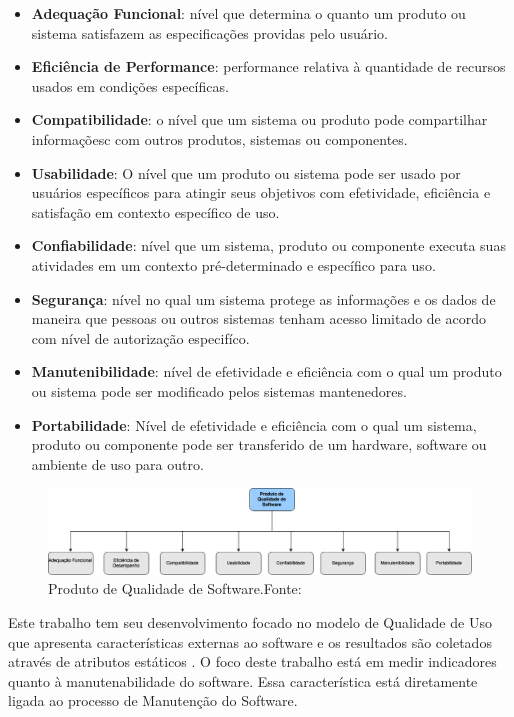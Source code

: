 \begin{itemize}
\item \textbf{Adequação Funcional}: nível que determina o quanto um produto ou sistema satisfazem as especificações providas pelo usuário.
\item \textbf{Eficiência de Performance}: performance relativa à quantidade de recursos usados em condições específicas.
\item \textbf{Compatibilidade}: o nível que um sistema ou produto pode compartilhar informaçõesc com outros produtos, sistemas ou componentes.
\item \textbf{Usabilidade}: O nível que um produto ou sistema pode ser usado por usuários específicos para atingir seus objetivos com efetividade, eficiência e satisfação em contexto específico de uso.
\item \textbf{Confiabilidade}: nível que um sistema, produto ou componente executa suas atividades em um contexto pré-determinado e específico para uso.
\item \textbf{Segurança}: nível no qual um sistema protege as informações e os dados de maneira que pessoas ou outros sistemas tenham acesso limitado de acordo com nível de autorização especifíco.
\item \textbf{Manutenibilidade}: nível de efetividade e eficiência com o qual um produto ou sistema pode ser modificado pelos sistemas mantenedores.
\item \textbf{Portabilidade}: Nível de efetividade e eficiência com o qual um sistema, produto ou componente pode ser transferido de um hardware, software ou ambiente de uso para outro.
\end{itemize}
\graphicspath{{figuras/}}
\begin{figure}[h]
\centering
\includegraphics[scale=0.40]{SQuaRE}
\caption{Produto de Qualidade de Software.Fonte:\cite{Square}}
\label{img:modelo_square}
\end{figure}

Este trabalho tem seu desenvolvimento focado no modelo de Qualidade de Uso que apresenta características externas ao software e os resultados são coletados através de atributos estáticos \cite{Square}. O foco deste trabalho está em medir indicadores quanto à manutenabilidade do software. Essa característica está diretamente ligada ao processo de Manutenção do Software.  

